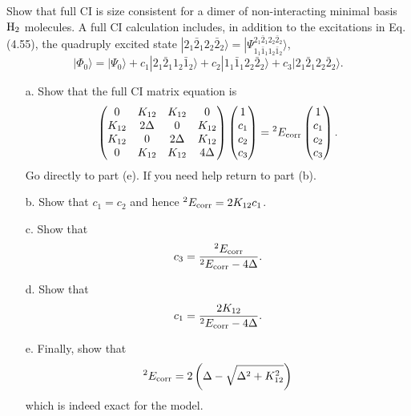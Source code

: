 \documentclass[a4paper]{book}
\newcommand{\corr}{{\rm corr}}
\begin{document}
	\begin{exercise}
	Show that full CI is size consistent for a dimer of non-interacting minimal basis $\ce{H_2}$ molecules. A full CI calculation includes, in addition to the excitations in Eq.(4.55), the quadruply excited state $| 2_1 \bar{2}_1 2_2 \bar{2}_2 \rangle = | \Psi^{2_1 \bar{2}_1 2_2 \bar{2}_2}_{1_1 \bar{1}_1 1_2 \bar{1}_2} \rangle$,
	\[
		| \Phi_0 \rangle = | \Psi_0 \rangle + c_1 | 2_1 \bar{2}_1 1_2 \bar{1}_2 \rangle + c_2 | 1_1 \bar{1}_1 2_2 \bar{2}_2 \rangle + c_3 | 2_1 \bar{2}_1 2_2 \bar{2}_2 \rangle.
	\]
	\begin{enumerate}
	
	\item[a.] Show that the full CI matrix equation is
	\[
		\begin{pmatrix}
			0 & K_{12} & K_{12} & 0 \\
			K_{12} & 2\Delta & 0 & K_{12} \\
			K_{12} & 0 & 2\Delta & K_{12} \\
			0 & K_{12} & K_{12} & 4\Delta
		\end{pmatrix} \begin{pmatrix}
			1 \\ c_1 \\ c_2 \\c_3
		\end{pmatrix} = {}^{2} E_{\rm corr} \begin{pmatrix}
			1 \\ c_1 \\ c_2 \\ c_3
		\end{pmatrix}.
	\]	
	Go directly to part (e). If you need help return to part (b).
	
	\item[b.] Show that $c_1 = c_2$ and hence ${}^{2} E_{\rm corr} = 2 K_{12} c_1$.
	
	\item[c.] Show that
	\[
		c_3 = \frac{ {}^{2} E_\corr }{ {}^{2} E_\corr - 4\Delta}.
	\]
	
	\item[d.] Show that
	\[
		c_1 = \frac{ 2 K_{12} }{ {}^{2} E_\corr - 4\Delta }.
	\]
	
	\item[e.] Finally, show that
	\[
		{}^{2} E_\corr = 2\left( \Delta - \sqrt{ \Delta^2 + K^2_{12} } \right)
	\]
	which is indeed exact for the model.
	\end{enumerate}
	

\end{exercise}
\end{document}
